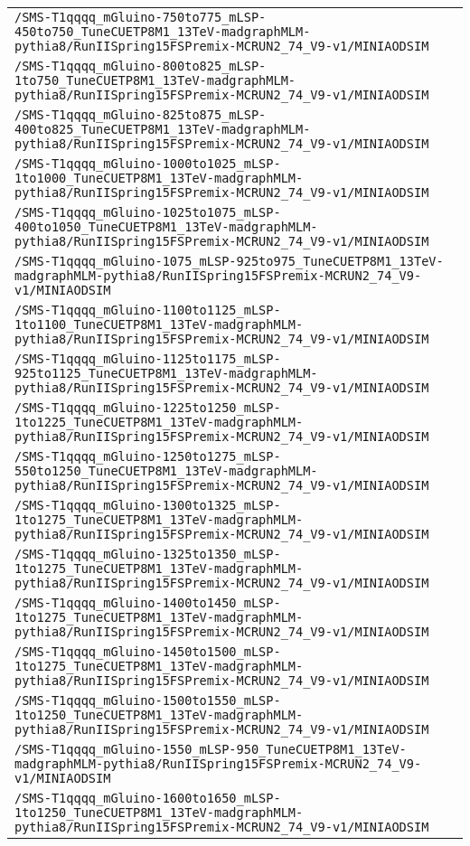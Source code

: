 \begin{center}
\begin{tabular}{l}
\verb!/SMS-T1qqqq_mGluino-750to775_mLSP-450to750_TuneCUETP8M1_13TeV-madgraphMLM-pythia8/RunIISpring15FSPremix-MCRUN2_74_V9-v1/MINIAODSIM! \tabularnewline
\verb!/SMS-T1qqqq_mGluino-800to825_mLSP-1to750_TuneCUETP8M1_13TeV-madgraphMLM-pythia8/RunIISpring15FSPremix-MCRUN2_74_V9-v1/MINIAODSIM! \tabularnewline
\verb!/SMS-T1qqqq_mGluino-825to875_mLSP-400to825_TuneCUETP8M1_13TeV-madgraphMLM-pythia8/RunIISpring15FSPremix-MCRUN2_74_V9-v1/MINIAODSIM! \tabularnewline
\verb!/SMS-T1qqqq_mGluino-1000to1025_mLSP-1to1000_TuneCUETP8M1_13TeV-madgraphMLM-pythia8/RunIISpring15FSPremix-MCRUN2_74_V9-v1/MINIAODSIM! \tabularnewline
\verb!/SMS-T1qqqq_mGluino-1025to1075_mLSP-400to1050_TuneCUETP8M1_13TeV-madgraphMLM-pythia8/RunIISpring15FSPremix-MCRUN2_74_V9-v1/MINIAODSIM! \tabularnewline
\verb!/SMS-T1qqqq_mGluino-1075_mLSP-925to975_TuneCUETP8M1_13TeV-madgraphMLM-pythia8/RunIISpring15FSPremix-MCRUN2_74_V9-v1/MINIAODSIM! \tabularnewline
\verb!/SMS-T1qqqq_mGluino-1100to1125_mLSP-1to1100_TuneCUETP8M1_13TeV-madgraphMLM-pythia8/RunIISpring15FSPremix-MCRUN2_74_V9-v1/MINIAODSIM! \tabularnewline
\verb!/SMS-T1qqqq_mGluino-1125to1175_mLSP-925to1125_TuneCUETP8M1_13TeV-madgraphMLM-pythia8/RunIISpring15FSPremix-MCRUN2_74_V9-v1/MINIAODSIM! \tabularnewline
\verb!/SMS-T1qqqq_mGluino-1225to1250_mLSP-1to1225_TuneCUETP8M1_13TeV-madgraphMLM-pythia8/RunIISpring15FSPremix-MCRUN2_74_V9-v1/MINIAODSIM! \tabularnewline
\verb!/SMS-T1qqqq_mGluino-1250to1275_mLSP-550to1250_TuneCUETP8M1_13TeV-madgraphMLM-pythia8/RunIISpring15FSPremix-MCRUN2_74_V9-v1/MINIAODSIM! \tabularnewline
\verb!/SMS-T1qqqq_mGluino-1300to1325_mLSP-1to1275_TuneCUETP8M1_13TeV-madgraphMLM-pythia8/RunIISpring15FSPremix-MCRUN2_74_V9-v1/MINIAODSIM! \tabularnewline
\verb!/SMS-T1qqqq_mGluino-1325to1350_mLSP-1to1275_TuneCUETP8M1_13TeV-madgraphMLM-pythia8/RunIISpring15FSPremix-MCRUN2_74_V9-v1/MINIAODSIM! \tabularnewline
\verb!/SMS-T1qqqq_mGluino-1400to1450_mLSP-1to1275_TuneCUETP8M1_13TeV-madgraphMLM-pythia8/RunIISpring15FSPremix-MCRUN2_74_V9-v1/MINIAODSIM! \tabularnewline
\verb!/SMS-T1qqqq_mGluino-1450to1500_mLSP-1to1275_TuneCUETP8M1_13TeV-madgraphMLM-pythia8/RunIISpring15FSPremix-MCRUN2_74_V9-v1/MINIAODSIM! \tabularnewline
\verb!/SMS-T1qqqq_mGluino-1500to1550_mLSP-1to1250_TuneCUETP8M1_13TeV-madgraphMLM-pythia8/RunIISpring15FSPremix-MCRUN2_74_V9-v1/MINIAODSIM! \tabularnewline
\verb!/SMS-T1qqqq_mGluino-1550_mLSP-950_TuneCUETP8M1_13TeV-madgraphMLM-pythia8/RunIISpring15FSPremix-MCRUN2_74_V9-v1/MINIAODSIM! \tabularnewline
\verb!/SMS-T1qqqq_mGluino-1600to1650_mLSP-1to1250_TuneCUETP8M1_13TeV-madgraphMLM-pythia8/RunIISpring15FSPremix-MCRUN2_74_V9-v1/MINIAODSIM! \tabularnewline

\end{tabular}
\end{center}
